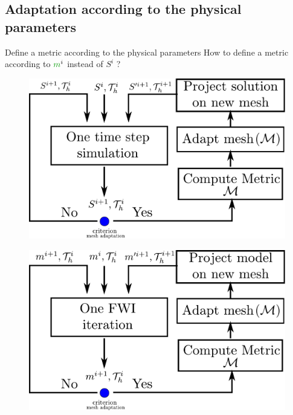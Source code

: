 \subsection{Adaptation according to the physical parameters}
\begin{frame}{Define a metric according to the physical parameters}
  How to define a metric according to $\smodel^i$ instead of $S^i$ ?
  \vspace{0.5cm}
  \begin{multicols}{2}
    \vspace{-1cm}
    \begin{figure}
      \includegraphics[scale=0.27]{image/mesh_adapt_workflow.pdf}
    \end{figure}
    \columnbreak
        \begin{figure}
      \includegraphics[scale=0.27]{image/mesh_adapt_workflow_fwi.pdf}
    \end{figure}
     \end{multicols}
\end{frame}


